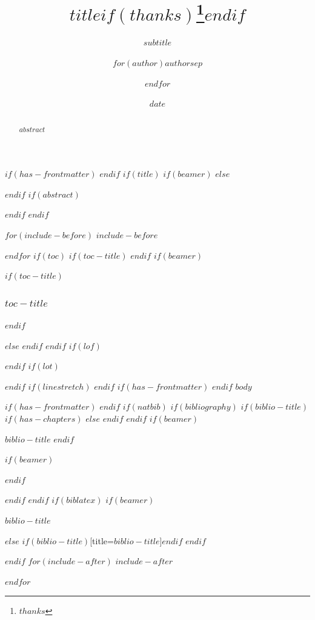 \documentclass[
$if(fontsize)$
  $fontsize$,
$endif$
$if(papersize)$
  $papersize$paper,
$endif$
$if(beamer)$
  ignorenonframetext,
$if(handout)$
  handout,
$endif$
$if(aspectratio)$
  aspectratio=$aspectratio$,
$endif$
$endif$
$for(classoption)$
  $classoption$$sep$,
$endfor$
]{$documentclass$}
\title{$title$$if(thanks)$\thanks{$thanks$}$endif$}
\subtitle{$subtitle$}
\author{$for(author)$$author$$sep$ \and $endfor$}
\date{$date$}
\institute{$for(institute)$$institute$$sep$ \and $endfor$}
\newif\ifbibliography
\begin{document}
\pagecolor{DraculaBackground}
\color{DraculaForeground}

$if(has-frontmatter)$
\frontmatter
$endif$
$if(title)$
$if(beamer)$
\frame{\titlepage}
$else$
\maketitle
$endif$
$if(abstract)$
\begin{abstract}
$abstract$
\end{abstract}
$endif$
$endif$

$for(include-before)$
$include-before$

$endfor$
$if(toc)$
$if(toc-title)$
\renewcommand*\contentsname{$toc-title$}
$endif$
$if(beamer)$
\begin{frame}[allowframebreaks]
$if(toc-title)$
  \frametitle{$toc-title$}
$endif$
  \tableofcontents[hideallsubsections]
\end{frame}
$else$
{
\hypersetup{linkcolor=DraculaForeground}
\setcounter{tocdepth}{$toc-depth$}
\tableofcontents
}
$endif$
$endif$
$if(lof)$
\listoffigures
$endif$
$if(lot)$
\listoftables
$endif$
$if(linestretch)$
$endif$
$if(has-frontmatter)$
\mainmatter
$endif$
$body$

$if(has-frontmatter)$
\backmatter
$endif$
$if(natbib)$
$if(bibliography)$
$if(biblio-title)$
$if(has-chapters)$
\renewcommand\bibname{$biblio-title$}
$else$
\renewcommand\refname{$biblio-title$}
$endif$
$endif$
$if(beamer)$
\begin{frame}[allowframebreaks]{$biblio-title$}
  \bibliographytrue
$endif$
  
$if(beamer)$
\end{frame}
$endif$

$endif$
$endif$
$if(biblatex)$
$if(beamer)$
\begin{frame}[allowframebreaks]{$biblio-title$}
  \bibliographytrue
  \printbibliography[heading=none]
\end{frame}
$else$
\printbibliography$if(biblio-title)$[title=$biblio-title$]$endif$
$endif$

$endif$
$for(include-after)$
$include-after$

$endfor$
\end{document}
